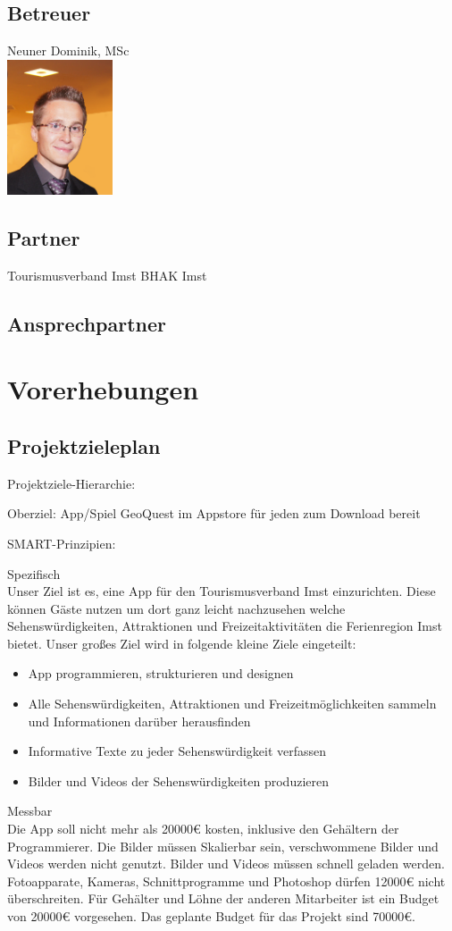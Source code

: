 \subsection{Betreuer}
Neuner Dominik, MSc\\
\includegraphics[height=4cm]{neuner}
\subsection{Partner}
Tourismusverband Imst
BHAK Imst
\subsection{Ansprechpartner}
\section{Vorerhebungen}
\subsection{Projektzieleplan}
Projektziele-Hierarchie:

Oberziel: App/Spiel GeoQuest im Appstore für jeden zum Download bereit

SMART-Prinzipien:

Spezifisch\\
Unser Ziel ist es, eine App für den Tourismusverband Imst einzurichten. Diese können Gäste nutzen um dort ganz leicht nachzusehen welche Sehenswürdigkeiten, Attraktionen und Freizeitaktivitäten die Ferienregion Imst bietet. Unser großes Ziel wird in folgende kleine Ziele eingeteilt:
\begin{itemize}
\item App programmieren, strukturieren und designen
\item Alle Sehenswürdigkeiten, Attraktionen und Freizeitmöglichkeiten sammeln und Informationen darüber herausfinden
\item Informative Texte zu jeder Sehenswürdigkeit verfassen
\item Bilder und Videos der Sehenswürdigkeiten produzieren
\end{itemize}
Messbar\\
Die App soll nicht mehr als 20000€ kosten, inklusive den Gehältern der Programmierer. Die Bilder müssen Skalierbar sein, verschwommene Bilder und Videos werden nicht genutzt. Bilder und Videos müssen schnell geladen werden. Fotoapparate, Kameras, Schnittprogramme und Photoshop dürfen 12000€ nicht überschreiten. Für Gehälter und Löhne der anderen Mitarbeiter ist ein Budget von 20000€ vorgesehen. Das geplante Budget für das Projekt sind 70000€.


